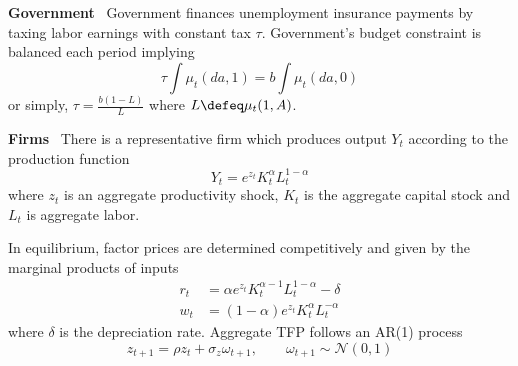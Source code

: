 \documentclass[a4paper,11pt]{article}  %
\begin{document}
\textbf{Government} \ Government finances unemployment insurance payments by taxing labor earnings with constant tax $\tau$.
Government's budget constraint is balanced each period implying
\begin{equation*}
   \label{eq:gov_budget}
   \tau \int \mu_t( da,1 ) = b \int \mu_t( da,0 )
\end{equation*}
or simply, $ \tau = \frac{b ( 1-L )}{L} $ where $ L \defeq \mu_t( 1, A) $.

\bigskip
\textbf{Firms} \ There is a representative firm which produces output $ Y_t $ according to the production function
\begin{equation*}
   \label{eq:prod_fnc}
   Y_t = e^{z_t} K_t^{\alpha} L_t^{ 1- \alpha }
\end{equation*}
where $ z_t $ is an aggregate productivity shock, $K_t$ is the aggregate capital stock and $ L_t $ is aggregate labor.

In equilibrium, factor prices are determined competitively and given by the marginal products of inputs
\begin{align*}
   \label{eq:factor_prices}
   r_t & = \alpha e^{z_t} K_t^{ \alpha-1 } L_t^{ 1- \alpha } - \delta \\
   w_t & = ( 1- \alpha ) e^{z_t} K_t^{ \alpha } L_t^{ - \alpha }
\end{align*}
%
where $ \delta $ is the depreciation rate. Aggregate TFP follows an AR(1) process
\begin{equation}
   \label{eq:tfp}
   z_{t+1} = \rho z_t + \sigma_z \omega_{t+1}, \qquad \omega_{t+1} \sim \mathcal{N}( 0,1 )
\end{equation}
\end{document}
